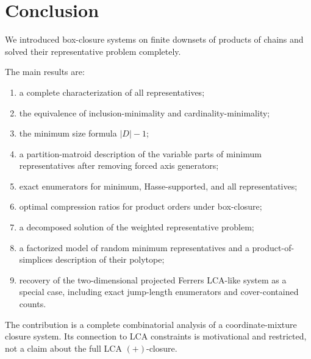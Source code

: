 \documentclass[11pt]{article}
\begin{document}
\section{Conclusion}

We introduced box-closure systems on finite downsets of products of chains and solved their representative problem completely.

The main results are:
\begin{enumerate}
\item a complete characterization of all representatives;
\item the equivalence of inclusion-minimality and cardinality-minimality;
\item the minimum size formula $|D|-1$;
\item a partition-matroid description of the variable parts of minimum representatives after removing forced axis generators;
\item exact enumerators for minimum, Hasse-supported, and all representatives;
\item optimal compression ratios for product orders under box-closure;
\item a decomposed solution of the weighted representative problem;
\item a factorized model of random minimum representatives and a product-of-simplices description of their polytope;
\item recovery of the two-dimensional projected Ferrers LCA-like system as a special case, including exact jump-length enumerators and cover-contained counts.
\end{enumerate}

The contribution is a complete combinatorial analysis of a coordinate-mixture closure system. Its connection to LCA constraints is motivational and restricted, not a claim about the full LCA $(+)$-closure.
\end{document}
